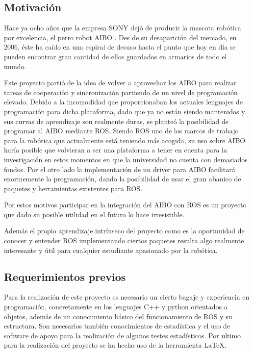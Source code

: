 \documentclass[12pt,a4paper,final,twoside]{book}
\begin{document}
\subsection{Motivación}
Hace ya ocho años que la empresa SONY dejó de producir la mascota robótica por excelencia, el perro robot AIBO \cite{aibo}. Des de su desaparición del mercado, en 2006, éste ha caído en una espiral de desuso hasta el punto que hoy en día se pueden encontrar gran cantidad de ellos guardados en armarios de todo el mundo.

Este proyecto partió de la idea de volver a aprovechar los AIBO para realizar tareas de cooperación y sincronización partiendo de un nivel de programación elevado. Debido a la incomodidad que proporcionaban los actuales lenguajes de programación para dicha plataforma, dado que ya no están siendo mantenidos y sus curvas de aprendizaje son realmente duras,   se planteó la posibilidad de programar al AIBO mediante ROS\cite{ros}.
Siendo ROS uno de los marcos de trabajo para la robótica que actualmente está teniendo más acogida, su uso sobre AIBO haría posible que volvieran a ser una plataforma a tener en cuenta para la investigación en estos momentos en que la universidad no cuenta con demasiados fondos. Por el otro lado la implementación de un driver para AIBO facilitará enormemente la programación, dando la posibilidad de usar el gran abanico de paquetes y herramientas existentes para ROS.

Por estos motivos participar en la integración del AIBO con ROS es un proyecto que dado su posible utilidad en el futuro lo hace irresistible.

Además el propio aprendizaje intrínseco del proyecto como es la oportunidad de conocer y entender ROS implementando ciertos paquetes resulta algo realmente interesante y útil para cualquier estudiante apasionado por la robótica.


\subsection{Requerimientos previos}
Para la realización de este proyecto es necesario un cierto bagaje y experiencia en programación, concretamente en los lenguajes C++ y python orientados a objetos, además de un conocimiento básico del funcionamiento de ROS y su estructura.
Son necesarios también conocimientos de estadística y el uso de software de apoyo para la realización de algunos testes estadísticos.
Por ultimo para la realización del proyecto se ha hecho uso de la herramienta \LaTeX. 
\newpage
\clearpage
\end{document}
